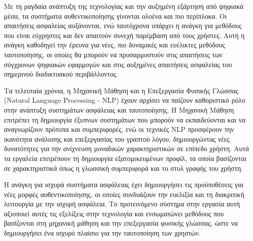 Με τη ραγδαία ανάπτυξη της τεχνολογίας και την αυξημένη εξάρτηση από ψηφιακά μέσα, τα συστήματα αυθεντικοποίησης γίνονται ολοένα και πιο περίπλοκα. Οι απαιτήσεις ασφαλείας αυξάνονται, ενώ ταυτόχρονα υπάρχει η ανάγκη για μεθόδους που είναι εύχρηστες και δεν απαιτούν συνεχή παρέμβαση από τους χρήστες. Αυτή η ανάγκη καθοδηγεί την έρευνα για νέες, πιο δυναμικές και ευέλικτες μεθόδους ταυτοποίησης, οι οποίες θα μπορούν να προσαρμοστούν στις απαιτήσεις των σύγχρονων ψηφιακών εφαρμογών και στις αυξημένες απαιτήσεις ασφαλείας του σημερινού διαδικτυακού περιβάλλοντος.

Τα τελευταία χρόνια, η Μηχανική Μάθηση και η Επεξεργασία Φυσικής Γλώσσας (Natural Language Processing - NLP) έχουν αρχίσει να παίζουν καθοριστικό ρόλο στην ανάπτυξη συστημάτων ασφάλειας και ταυτοποίησης. Η Μηχανική Μάθηση επιτρέπει τη δημιουργία έξυπνων συστημάτων που μπορούν να εκπαιδεύονται και να αναγνωρίζουν πρότυπα και συμπεριφορές, ενώ οι τεχνικές NLP προσφέρουν την ικανότητα ανάλυσης και επεξεργασίας του γραπτού λόγου, δημιουργώντας νέες δυνατότητες για την ανίχνευση μοναδικών χαρακτηριστικών σε επίπεδο χρήστη. Αυτά τα εργαλεία επιτρέπουν τη δημιουργία εξατομικευμένων προφίλ, τα οποία βασίζονται σε χαρακτηριστικά όπως η γλωσσική συμπεριφορά και το στυλ γραφής του χρήστη.

Η ανάγκη για ισχυρά συστήματα ασφάλειας έχει δημιουργήσει τις προϋποθέσεις για νέες μορφές αυθεντικοποίησης, οι οποίες συνδυάζουν την ευελιξία και τη διακριτική λειτουργία με την ισχυρή ασφάλεια. Το προτεινόμενο σύστημα στην εργασία αυτή αξιοποιεί αυτές τις εξελίξεις στην τεχνολογία και ενσωματώνει μεθόδους που βασίζονται στη μηχανική μάθηση και την επεξεργασία φυσικής γλώσσας, ώστε να δημιουργήσει ένα ισχυρό πλαίσιο για την ταυτοποίηση των χρηστών.







